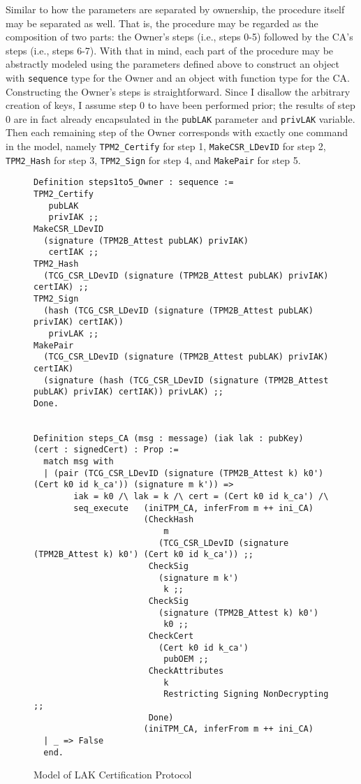  Similar to how the parameters are separated by ownership, the procedure itself may be separated as well. That is, the procedure may be regarded as the composition of two parts: the Owner's steps (i.e., steps 0-5) followed by the CA's steps (i.e., steps 6-7).
 With that in mind, each part of the procedure may be abstractly modeled  using the parameters defined above to construct an object with \verb|sequence| type for the Owner and an object with function type for the CA. Constructing the Owner's steps is straightforward. Since I disallow the arbitrary creation of keys, I assume step 0 to have been performed prior; the results of step 0 are in fact already encapsulated in the \verb|pubLAK| parameter and \verb|privLAK| variable. Then each remaining step of the Owner corresponds with exactly one command in the model, namely \verb|TPM2_Certify| for step 1, \verb|MakeCSR_LDevID| for step 2, \verb|TPM2_Hash| for step 3, \verb|TPM2_Sign| for step 4, and \verb|MakePair| for step 5. 
\begin{figure}[h!]
\begin{lstlisting}[language=Coq]
Definition steps1to5_Owner : sequence :=
TPM2_Certify 
   pubLAK 
   privIAK ;;
MakeCSR_LDevID 
  (signature (TPM2B_Attest pubLAK) privIAK) 
   certIAK ;;
TPM2_Hash 
  (TCG_CSR_LDevID (signature (TPM2B_Attest pubLAK) privIAK) certIAK) ;;
TPM2_Sign 
  (hash (TCG_CSR_LDevID (signature (TPM2B_Attest pubLAK) privIAK) certIAK)) 
   privLAK ;;
MakePair 
  (TCG_CSR_LDevID (signature (TPM2B_Attest pubLAK) privIAK) certIAK) 
  (signature (hash (TCG_CSR_LDevID (signature (TPM2B_Attest pubLAK) privIAK) certIAK)) privLAK) ;;
Done. 


Definition steps_CA (msg : message) (iak lak : pubKey) (cert : signedCert) : Prop :=
  match msg with
  | (pair (TCG_CSR_LDevID (signature (TPM2B_Attest k) k0') (Cert k0 id k_ca')) (signature m k')) =>
        iak = k0 /\ lak = k /\ cert = (Cert k0 id k_ca') /\
        seq_execute   (iniTPM_CA, inferFrom m ++ ini_CA)
                      (CheckHash 
                          m
                         (TCG_CSR_LDevID (signature (TPM2B_Attest k) k0') (Cert k0 id k_ca')) ;;
                       CheckSig
                         (signature m k') 
                          k ;;
                       CheckSig 
                         (signature (TPM2B_Attest k) k0') 
                          k0 ;;
                       CheckCert 
                         (Cert k0 id k_ca') 
                          pubOEM ;;
                       CheckAttributes 
                          k 
                          Restricting Signing NonDecrypting ;;
                       Done)
                      (iniTPM_CA, inferFrom m ++ ini_CA)
  | _ => False
  end.
\end{lstlisting}
\caption{Model of LAK Certification Protocol}
\label{fig:lak_model}
\end{figure}

